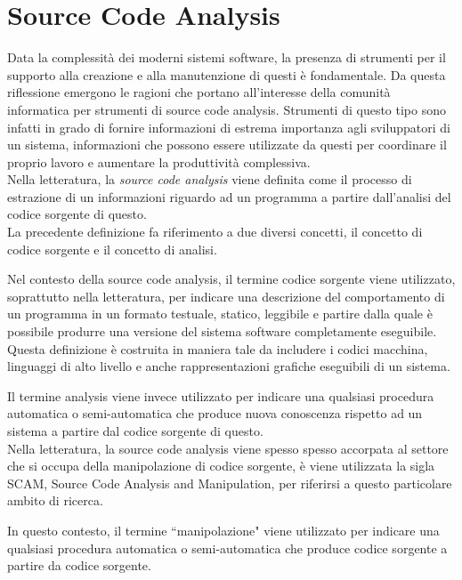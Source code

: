 \section{Source Code Analysis}
\label{source-code-analysis}

Data la complessità dei moderni sistemi software, la presenza di strumenti per
il supporto alla creazione e alla manutenzione di questi è fondamentale. Da
questa riflessione emergono le ragioni che portano all’interesse della comunità
informatica per strumenti di source code analysis. Strumenti di questo tipo sono
infatti in grado di fornire informazioni di estrema importanza agli sviluppatori
di un sistema, informazioni che possono essere utilizzate da questi per
coordinare il proprio lavoro e aumentare la produttività complessiva.\\

Nella letteratura, la \textit{source code analysis} viene definita come il
processo di estrazione di un informazioni riguardo ad un programma a partire
dall'analisi del codice sorgente di questo. \cite{DBLP:journals/jss/DeanHKV06}\\

La precedente definizione fa riferimento a due diversi concetti, il concetto di
codice sorgente e il concetto di analisi.

Nel contesto della source code analysis, il termine codice sorgente viene
utilizzato, soprattutto nella letteratura, per indicare una descrizione del
comportamento di un programma in un formato testuale, statico, leggibile e
partire dalla quale è possibile produrre una versione del sistema software
completamente eseguibile. Questa definizione è costruita in maniera tale da
includere i codici macchina, linguaggi di alto livello e anche rappresentazioni
grafiche eseguibili di un sistema.

Il termine analysis viene invece utilizzato per indicare una qualsiasi procedura
automatica o semi-automatica che produce nuova conoscenza rispetto ad un sistema
a partire dal codice sorgente di questo. \cite{DBLP:conf/icse/Binkley07}\\

Nella letteratura, la source code analysis viene spesso spesso accorpata al
settore che si occupa della manipolazione di codice sorgente, è viene utilizzata
la sigla SCAM, Source Code Analysis and Manipulation, per riferirsi a questo
particolare ambito di ricerca. \cite{DBLP:conf/scam/2001}

In questo contesto, il termine “manipolazione" viene utilizzato per indicare una
qualsiasi procedura automatica o semi-automatica che produce codice sorgente a
partire da codice sorgente.\\

